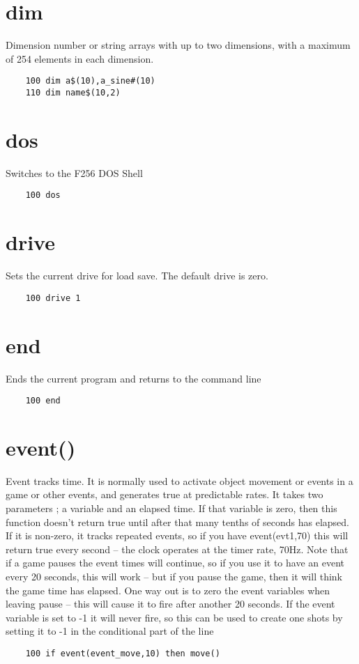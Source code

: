 \section*{dim}
Dimension number or string arrays with up to two dimensions, with a maximum of 254 elements in each dimension.
\example{}
\begin{verbatim}
	100 dim a$(10),a_sine#(10)
	110 dim name$(10,2)
\end{verbatim}

\section*{dos}
Switches to the F256 DOS Shell
\example{}
\begin{verbatim}
	100 dos
\end{verbatim}

\section*{drive}
Sets the current drive for load save. The default drive is zero.
\example{}
\begin{verbatim}
	100 drive 1
\end{verbatim}

\section*{end}
Ends the current program and returns to the command line
\example{}
\begin{verbatim}
	100 end
\end{verbatim}

\section*{event()}
Event tracks time. It is normally used to activate object movement or events in a game or other events, and generates true at predictable rates. It takes two parameters ; a variable and an elapsed time.
If that variable is zero, then this function doesn’t return true until after that many tenths of seconds has elapsed. If it is non-zero, it tracks repeated events, so if you have event(evt1,70) this will return true every second – the clock operates at the timer rate, 70Hz.
Note that if a game pauses the event times will continue, so if you use it to have an event every 20 seconds, this will work – but if you pause the game, then it will think the game time has elapsed. One way out is to zero the event variables when leaving pause – this will cause it to fire after another 20 seconds. 
If the event variable is set to -1 it will never fire, so this can be used to create one shots by setting it to -1 in the conditional part of the line
\example{}
\begin{verbatim}
	100 if event(event_move,10) then move()
\end{verbatim}

